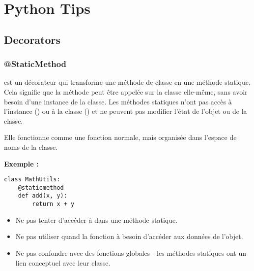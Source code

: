 
\chapter{Python Tips}
\label{chap:python_tips}

\minitableofcontents

\newpage


\section{Decorators}
\label{sec:decorators}

\subsection{@StaticMethod}
\label{sec:staticmethod}

 est un décorateur qui transforme une méthode de classe en une méthode statique. Cela signifie que la méthode peut être appelée sur la classe elle-même, sans avoir besoin d'une instance de la classe. Les méthodes statiques n'ont pas accès à l'instance () ou à la classe () et ne peuvent pas modifier l'état de l'objet ou de la classe.

\begin{TipBox}
    Elle fonctionne comme une fonction normale, mais organisée dans l'espace de noms de la classe.
\end{TipBox}

\vspace{1em}


\noindent\textbf{Exemple :}

\begin{verbatim}
class MathUtils:
    @staticmethod
    def add(x, y):
        return x + y
\end{verbatim}

\begin{ImportantBox}
    \begin{itemize}
        \item Ne pas tenter d'accéder à  dans une méthode statique.
        \item Ne pas utiliser  quand la fonction à besoin d'accéder aux données de l'objet.
        \item Ne pas confondre avec des fonctions globales - les méthodes statiques ont un lien conceptuel avec leur classe.
    \end{itemize}
\end{ImportantBox}